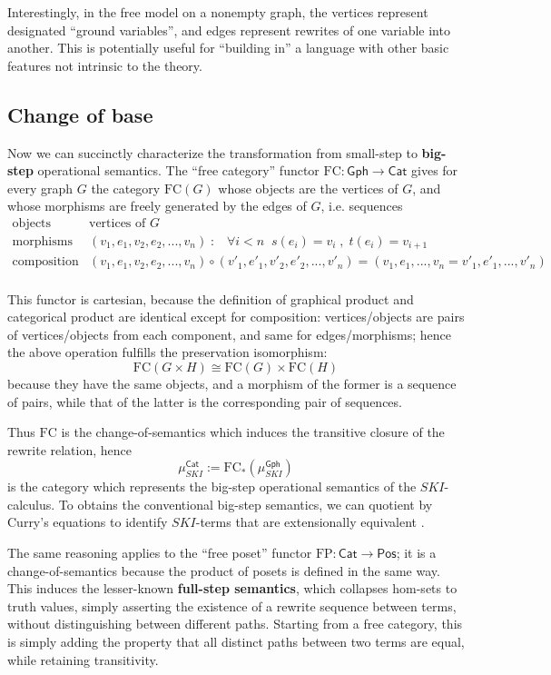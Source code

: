 \documentclass{amsart}
\theoremstyle{definition}
\newcommand{\Gph}{\mathsf{Gph}}
\newcommand{\Cat}{\mathsf{Cat}}
\newcommand{\Pos}{\mathsf{Pos}}
\newcommand{\FC}{\mathrm{FC}}
\newcommand{\FP}{\mathrm{FP}}
\newcommand{\maps}{\colon}
\begin{document}
Interestingly, in the free model on a nonempty graph, the vertices represent designated ``ground variables'', and edges represent rewrites of one variable into another. This is potentially useful for ``building in'' a language with other basic features not intrinsic to the theory.

\subsection{Change of base}
Now we can succinctly characterize the transformation from small-step to \textbf{big-step} operational semantics. The ``free category'' functor $\FC\maps \Gph \to \Cat$ gives for every graph $G$ the category $\FC(G)$ whose objects are the vertices of $G$, and whose morphisms are freely generated by the edges of $G$, i.e. sequences 
\[\begin{array}{rl}
\text{objects} & \text{vertices of } G\\
\text{morphisms} & (v_1,e_1,v_2,e_2,...,v_n) \; : \; \;\; \forall i<n \;\; s(e_i)=v_i \; , \; t(e_i)=v_{i+1}\\
\text{composition} & (v_1,e_1,v_2,e_2,...,v_n) \circ (v'_1,e'_1,v'_2,e'_2,...,v'_n) = (v_1,e_1,...,v_n=v'_1,e'_1,...,v'_n)\\
\end{array}\]

This functor is cartesian, because the definition of graphical product and categorical product are identical except for composition: vertices/objects are pairs of vertices/objects from each component, and same for edges/morphisms; hence the above operation fulfills the preservation isomorphism: $$\FC(G\times H) \cong \FC(G)\times \FC(H)$$ because they have the same objects, and a morphism of the former is a sequence of pairs, while that of the latter is the corresponding pair of sequences.

Thus $\FC$ is the change-of-semantics which induces the transitive closure of the rewrite relation, hence $$\mu_{SKI}^\Cat := \FC_*(\mu_{SKI}^\Gph)$$ is the category which represents the big-step operational semantics of the $SKI$-calculus. To obtains the conventional big-step semantics, we can quotient by Curry's equations to identify $SKI$-terms that are extensionally equivalent \cite{barendregt}.

The same reasoning applies to the ``free poset'' functor $\FP\maps \Cat \to \Pos$; it is a change-of-semantics because the product of posets is defined in the same way. This induces the lesser-known \textbf{full-step semantics}, which collapses hom-sets to truth values, simply asserting the existence of a rewrite sequence between terms, without distinguishing between different paths. Starting from a free category, this is simply adding the property that all distinct paths between two terms are equal, while retaining transitivity.
\end{document}
